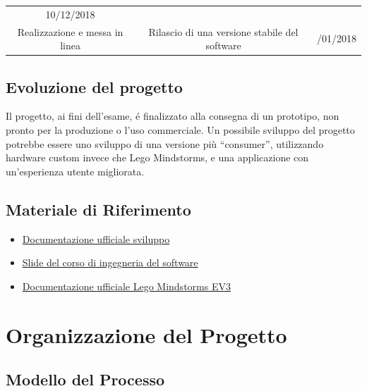 \documentclass{article}
\begin{document}
\begin{longtable}[]{@{}ccc@{}}
\begin{minipage}[t]{0.13\columnwidth}
  10/12/2018\strut
  \end{minipage}\tabularnewline
  \begin{minipage}[t]{0.31\columnwidth}\centering
  Realizzazione e messa in linea\strut
  \end{minipage} & \begin{minipage}[t]{0.47\columnwidth}\centering
  Rilascio di una versione stabile del software\strut
  \end{minipage} & \begin{minipage}[t]{0.13\columnwidth}\centering
  31/01/2018\strut
  \end{minipage}\tabularnewline
  \bottomrule
  \end{longtable}
  
  \subsection{Evoluzione del progetto}
  
  Il progetto, ai fini dell'esame, é finalizzato alla consegna di un
  prototipo, non pronto per la produzione o l'uso commerciale. Un
  possibile sviluppo del progetto potrebbe essere uno sviluppo di una
  versione più ``consumer'', utilizzando hardware custom invece che Lego
  Mindstorms, e una applicazione con un'esperienza utente migliorata.
  
  \subsection{Materiale di Riferimento}
  
  \begin{itemize}
  \item \href{http://developer.android.com}{Documentazione ufficiale sviluppo}
  \item \href{https://www.unive.it/data/insegnamento/89084}{Slide del corso di ingegneria del software}
  \item \href{https://le-www-live-s.legocdn.com/ev3/userguide/1.4.0/ev3\_userguide\_enus.pdf}{Documentazione ufficiale Lego Mindstorms EV3}
  \end{itemize}
  
  \section{Organizzazione del Progetto}
  
  \subsection{Modello del Processo}
  
\end{document}
